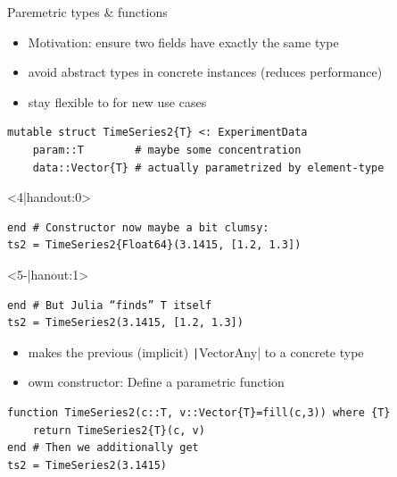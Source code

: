 \documentclass[aspectratio=169, 11pt, handout]{beamer}
\begin{document}
    \begin{frame}[fragile]{Paremetric types \& functions}
        \begin{itemize}
            \item \alert{Motivation:} ensure two fields have \alert{exactly the same type}
            \pause
            \item avoid abstract types in concrete instances (reduces performance)
            \pause
            \item stay flexible to for new use cases
        \end{itemize}
        \pause
        \begin{verbatim}
mutable struct TimeSeries2{T} <: ExperimentData
    param::T        # maybe some concentration
    data::Vector{T} # actually parametrized by element-type
        \end{verbatim}
    \begin{onlyenv}<4|handout:0>
        \begin{verbatim}
end # Constructor now maybe a bit clumsy:
ts2 = TimeSeries2{Float64}(3.1415, [1.2, 1.3])
        \end{verbatim}
    \end{onlyenv}
    \begin{onlyenv}<5-|hanout:1>%
\begin{verbatim}
end # But Julia “finds” T itself
ts2 = TimeSeries2(3.1415, [1.2, 1.3])
    \end{verbatim}
\end{onlyenv}
        \pause\pause
        \begin{itemize}
            \item makes the previous (implicit) \texttt|Vector{Any}| to a concrete type
            \pause
            \item owm constructor: Define a \alert{parametric function}
        \end{itemize}
        \begin{verbatim}
function TimeSeries2(c::T, v::Vector{T}=fill(c,3)) where {T}
    return TimeSeries2{T}(c, v)
end # Then we additionally get
ts2 = TimeSeries2(3.1415)
        \end{verbatim}
    \end{frame}
\end{document}
